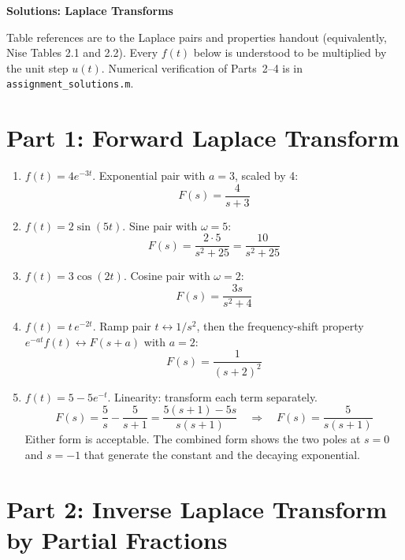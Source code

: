 \documentclass[11pt]{article}
\begin{document}
\begin{center}
  \Large{\bf{Solutions: Laplace Transforms}}
\end{center}

Table references are to the Laplace pairs and properties handout
(equivalently, Nise Tables 2.1 and 2.2).  Every $f(t)$ below is understood
to be multiplied by the unit step $u(t)$.  Numerical verification of Parts~2--4
is in \texttt{assignment\_solutions.m}.

\section*{Part 1: Forward Laplace Transform}

\begin{enumerate}

\item $f(t) = 4e^{-3t}$.  Exponential pair with $a = 3$, scaled by 4:
\[
  \boxed{F(s) = \frac{4}{s+3}}
\]

\item $f(t) = 2\sin(5t)$.  Sine pair with $\omega = 5$:
\[
  \boxed{F(s) = \frac{2\cdot 5}{s^2 + 25} = \frac{10}{s^2 + 25}}
\]

\item $f(t) = 3\cos(2t)$.  Cosine pair with $\omega = 2$:
\[
  \boxed{F(s) = \frac{3s}{s^2 + 4}}
\]

\item $f(t) = t\,e^{-2t}$.  Ramp pair $t \leftrightarrow 1/s^2$, then the
frequency-shift property $e^{-at}f(t) \leftrightarrow F(s+a)$ with $a = 2$:
\[
  \boxed{F(s) = \frac{1}{(s+2)^2}}
\]

\item $f(t) = 5 - 5e^{-t}$.  Linearity: transform each term separately.
\[
  F(s) = \frac{5}{s} - \frac{5}{s+1}
       = \frac{5(s+1) - 5s}{s(s+1)}
  \quad\Rightarrow\quad
  \boxed{F(s) = \frac{5}{s(s+1)}}
\]
Either form is acceptable.  The combined form shows the two poles at $s=0$
and $s=-1$ that generate the constant and the decaying exponential.

\end{enumerate}

\section*{Part 2: Inverse Laplace Transform by Partial Fractions}
\end{document}

